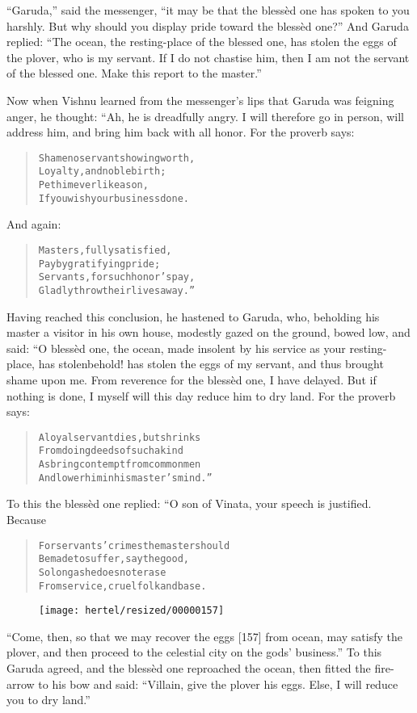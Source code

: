 \documentclass[article, twoside, 10pt]{memoir}
\renewenvironment{verbatim}{%
\begin{quote}%
\vskip -10pt%
\begin{alltt}\normalfont\small}{\end{alltt}%
\end{quote}%
\vskip -10pt
} %
\begin{document}
``Garuda,'' said the messenger,
``it may be that the blessèd one has spoken to you harshly. But why should you display pride toward the blessèd one?''
And Garuda replied:
``The ocean, the resting-place of the blessed one, has stolen the eggs of the plover, who is my servant. If I do not chastise him, then I am not the servant of the blessed one. Make this report to the master.''

Now when Vishnu learned from the messenger's lips that Garuda was
feigning anger, he thought: “Ah, he is dreadfully angry. I will
therefore go in person, will address him, and bring him back with
all honor. For the proverb says:

\begin{verbatim}
Shame no servant showing worth,
Loyalty, and noble birth;
Pet him ever like a son,
If you wish your business done.
\end{verbatim}
And again:

\begin{verbatim}
Masters, fully satisfied,
Pay by gratifying pride;
Servants, for such honor's pay,
Gladly throw their lives away.”
\end{verbatim}
Having reached this conclusion, he hastened to Garuda, who,
beholding his master a visitor in his own house, modestly gazed on
the ground, bowed low, and said: “O blessèd one, the ocean, made
insolent by his service as your resting-place, has stolen{\textemdash}behold!
has stolen the eggs of my servant, and thus brought shame upon me.
From reverence for the blessèd one, I have delayed. But if nothing
is done, I myself will this day reduce him to dry land. For the
proverb says:

\begin{verbatim}
A loyal servant dies, but shrinks
    From doing deeds of such a kind
As bring contempt from common men
    And lower him in his master's mind.”
\end{verbatim}
To this the blessèd one replied: “O son of Vinata, your speech is
justified. Because

\begin{verbatim}
For servants' crimes the master should
Be made to suffer, say the good,
So long as he does not erase
From service, cruel folk and base.
\end{verbatim}
\begin{figure}[p]\texttt{[image: hertel/resized/00000157]}\end{figure}``Come, then, so that we may recover the eggs [157] from ocean, may satisfy the plover, and then proceed to the celestial city on the gods' business.''
To this Garuda agreed, and the blessèd one reproached the ocean,
then fitted the fire-arrow to his bow and said:
``Villain, give the plover his eggs. Else, I will reduce you to dry land.''
\end{document}

